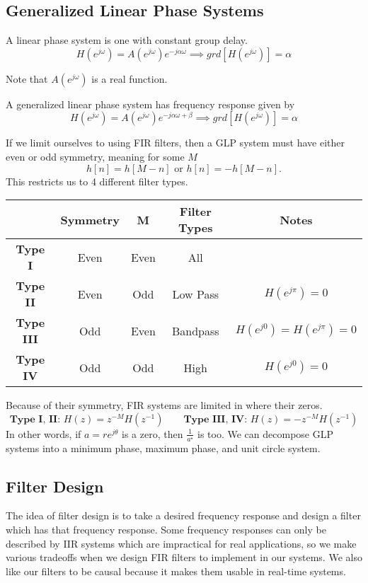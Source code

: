 \subsection{Generalized Linear Phase Systems}
\begin{definition}
  A linear phase system is one with constant group delay.
  \[
	H(e^{j\omega}) = A(e^{j\omega})e^{-j\alpha\omega} \implies grd[H(e^{j\omega})] = \alpha
  \]
  \label{defn:linear-phase}
\end{definition}
Note that $A(e^{j\omega})$ is a real function. 
\begin{definition}
  A generalized linear phase system has frequency response given by 
  \[
	H(e^{j\omega}) = A(e^{j\omega})e^{-j\alpha\omega + \beta} \implies grd[H(e^{j\omega})] = \alpha
  \]
  \label{defn:gen-lin-phase}
\end{definition}
If we limit ourselves to using FIR filters, then a GLP system must have either even or odd symmetry, meaning for some $M$
\[
  h[n]=h[M-n] \text{ or } h[n] = -h[M-n].
\]
This restricts us to 4 different filter types.
\begin{center}
  \begin{tabular}{|c|c|c|c|c|}
    \hline 
    & \textbf{Symmetry} & \textbf{M} & \textbf{Filter Types} & \textbf{Notes}\\
     \hline
     \textbf{Type I} & Even & Even & All & \\
     \hline
     \textbf{Type II} & Even & Odd & Low Pass & $H(e^{j\pi})=0$\\
     \hline
     \textbf{Type III} & Odd & Even & Bandpass & $H(e^{j0})=H(e^{j\pi})=0$\\
     \hline
     \textbf{Type IV} & Odd & Odd & High & $H(e^{j0})=0$\\
     \hline
  \end{tabular}
\end{center}
Because of their symmetry, FIR systems are limited in where their zeros.
\[
  \textbf{Type I, II: }H(z) = z^{-M}H(z^{-1}) \qquad \textbf{Type III, IV: } H(z) = -z^{-M}H(z^{-1})
\]
In other words, if $a = re^{j\theta}$ is a zero, then $\frac{1}{a^\star}$ is too.
We can decompose GLP systems into a minimum phase, maximum phase, and unit circle system.
\subsection{Filter Design}
The idea of filter design is to take a desired frequency response and design a filter which has that frequency response.
Some frequency responses can only be described by IIR systems which are impractical for real applications, so we make various tradeoffs
when we design FIR filters to implement in our systems. We also like our filters to be causal because it makes them usable in real-time systems.

